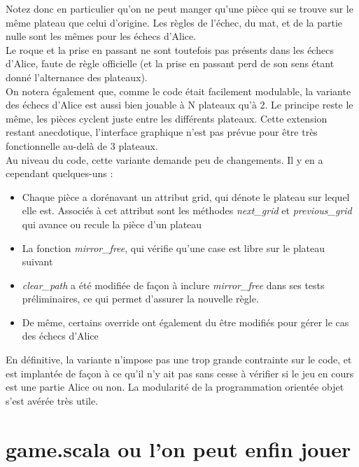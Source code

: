 \documentclass[a4paper]{article}
\begin{document}
Notez donc en particulier qu'on ne peut manger qu'une pièce qui se trouve sur le même plateau que celui d'origine. Les règles de l'échec, du mat, et de la partie nulle sont les mêmes pour les échecs d'Alice. \\

Le roque et la prise en passant ne sont toutefois pas présents dans les échecs d'Alice, faute de règle officielle (et la prise en passant perd de son sens étant donné l'alternance des plateaux). \\

On notera également que, comme le code était facilement modulable, la variante des échecs d'Alice est aussi bien jouable à N plateaux qu'à 2. Le principe reste le même, les pièces cyclent juste entre les différents plateaux. Cette extension restant anecdotique, l'interface graphique n'est pas prévue pour être très fonctionnelle au-delà de 3 plateaux. \\

Au niveau du code, cette variante demande peu de changements. Il y en a cependant quelques-uns : 

\begin{itemize}

\item{Chaque pièce a dorénavant un attribut grid, qui dénote le plateau sur lequel elle est. Associés à cet attribut sont les méthodes \textit{next\_grid} et \textit{previous\_grid} qui avance ou recule la pièce d'un plateau}
\item{La fonction \textit{mirror\_free}, qui vérifie qu'une case est libre sur le plateau suivant}
\item{\textit{clear\_path} a été modifiée de façon à inclure \textit{mirror\_free} dans ses tests préliminaires, ce qui permet d'assurer la nouvelle règle.}
\item{De même, certains override ont également du être modifiés pour gérer le cas des échecs d'Alice}
\end{itemize}

En définitive, la variante n'impose pas une trop grande contrainte sur le code, et est implantée de façon à ce qu'il n'y ait pas sans cesse à vérifier si le jeu en cours est une partie Alice ou non. La modularité de la programmation orientée objet s'est avérée très utile.

\section{game.scala ou l'on peut enfin jouer}
\end{document}
